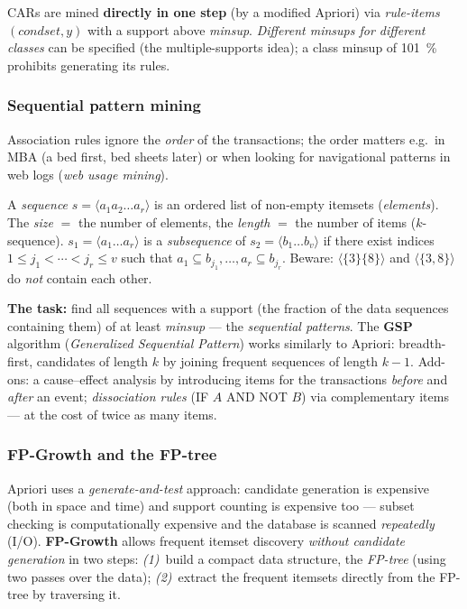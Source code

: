 \documentclass[11pt,a4paper]{article}
\theoremstyle{definition}
\begin{document}
CARs are mined \textbf{directly in one step} (by a modified Apriori) via \emph{rule-items}
$(\mathit{condset},y)$ with a support above \emph{minsup}. \emph{Different minsups for
different classes} can be specified (the multiple-supports idea); a class minsup of 101~\%
prohibits generating its rules.

\subsubsection{Sequential pattern mining}

Association rules ignore the \emph{order} of the transactions; the order matters e.g.\ in MBA
(a bed first, bed sheets later) or when looking for navigational patterns in web logs
(\emph{web usage mining}).

\begin{defbox}
A \emph{sequence} $s=\langle a_1a_2\dots a_r\rangle$ is an ordered list of non-empty itemsets
(\emph{elements}). The \emph{size} $=$ the number of elements, the \emph{length} $=$ the
number of items ($k$-sequence). $s_1=\langle a_1\dots a_r\rangle$ is a \emph{subsequence} of
$s_2=\langle b_1\dots b_v\rangle$ if there exist indices $1\le j_1<\cdots<j_r\le v$ such that
$a_1\subseteq b_{j_1},\dots,a_r\subseteq b_{j_r}$. Beware: $\langle\{3\}\{8\}\rangle$ and
$\langle\{3,8\}\rangle$ do \emph{not} contain each other.
\end{defbox}

\textbf{The task:} find all sequences with a support (the fraction of the data sequences
containing them) of at least \emph{minsup} --- the \emph{sequential patterns}. The
\textbf{GSP} algorithm (\emph{Generalized Sequential Pattern}) works similarly to Apriori:
breadth-first, candidates of length $k$ by joining frequent sequences of length $k-1$.
Add-ons: a cause--effect analysis by introducing items for the transactions \emph{before} and
\emph{after} an event; \emph{dissociation rules} (IF $A$ AND NOT $B$) via complementary items
--- at the cost of twice as many items.

\subsubsection{FP-Growth and the FP-tree}

Apriori uses a \emph{generate-and-test} approach: candidate generation is expensive (both in
space and time) and support counting is expensive too --- subset checking is computationally
expensive and the database is scanned \emph{repeatedly} (I/O). \textbf{FP-Growth} allows frequent
itemset discovery \emph{without candidate generation} in two steps: \emph{(1)}~build a compact
data structure, the \emph{FP-tree} (using two passes over the data); \emph{(2)}~extract the
frequent itemsets directly from the FP-tree by traversing it.
\end{document}
